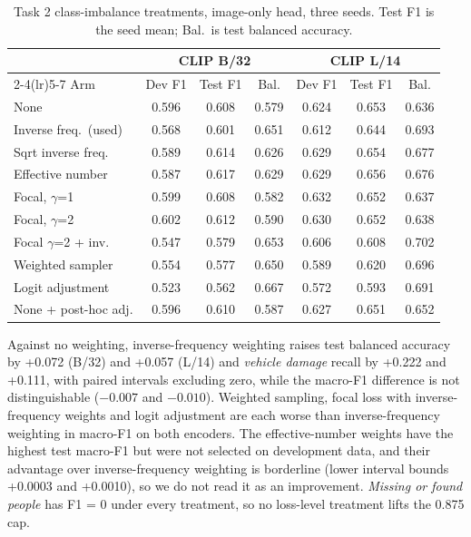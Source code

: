 \documentclass[conference]{IEEEtran}
\begin{document}
\begin{table}[t]
\centering
\caption{Task 2 class-imbalance treatments, image-only head, three seeds. Test F1 is the seed mean; Bal.\ is test balanced accuracy.}
\label{tab:imb}
\footnotesize
\setlength{\tabcolsep}{3pt}
\begin{tabular}{lcccccc}
\toprule
 & \multicolumn{3}{c}{CLIP B/32} & \multicolumn{3}{c}{CLIP L/14} \\
\cmidrule(lr){2-4}\cmidrule(lr){5-7}
Arm & Dev F1 & Test F1 & Bal. & Dev F1 & Test F1 & Bal. \\
\midrule
None & 0.596 & 0.608 & 0.579 & 0.624 & 0.653 & 0.636 \\
Inverse freq.\ (used) & 0.568 & 0.601 & 0.651 & 0.612 & 0.644 & 0.693 \\
Sqrt inverse freq. & 0.589 & 0.614 & 0.626 & 0.629 & 0.654 & 0.677 \\
Effective number~\cite{cui2019} & 0.587 & 0.617 & 0.629 & 0.629 & 0.656 & 0.676 \\
Focal, $\gamma$=1 & 0.599 & 0.608 & 0.582 & 0.632 & 0.652 & 0.637 \\
Focal, $\gamma$=2 & 0.602 & 0.612 & 0.590 & 0.630 & 0.652 & 0.638 \\
Focal $\gamma$=2 + inv. & 0.547 & 0.579 & 0.653 & 0.606 & 0.608 & 0.702 \\
Weighted sampler & 0.554 & 0.577 & 0.650 & 0.589 & 0.620 & 0.696 \\
Logit adjustment~\cite{menon2021} & 0.523 & 0.562 & 0.667 & 0.572 & 0.593 & 0.691 \\
None + post-hoc adj. & 0.596 & 0.610 & 0.587 & 0.627 & 0.651 & 0.652 \\
\bottomrule
\end{tabular}
\end{table}

Against no weighting, inverse-frequency weighting raises test balanced accuracy by +0.072 (B/32) and +0.057 (L/14) and \emph{vehicle damage} recall by +0.222 and +0.111, with paired intervals excluding zero, while the macro-F1 difference is not distinguishable ($-0.007$ and $-0.010$). Weighted sampling, focal loss with inverse-frequency weights and logit adjustment are each worse than inverse-frequency weighting in macro-F1 on both encoders. The effective-number weights have the highest test macro-F1 but were not selected on development data, and their advantage over inverse-frequency weighting is borderline (lower interval bounds +0.0003 and +0.0010), so we do not read it as an improvement. \emph{Missing or found people} has F1 = 0 under every treatment, so no loss-level treatment lifts the 0.875 cap.
\end{document}
